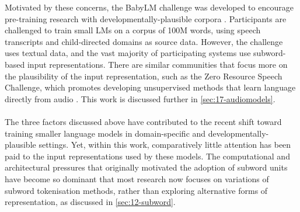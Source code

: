 
Motivated by these concerns, the BabyLM challenge was developed to encourage pre-training research with developmentally-plausible corpora \citep{warstadt2023findings, hu-etal-2024-findings}. Participants are challenged to train small LMs on a corpus of 100M words, using speech transcripts and child-directed domains as source data. However, the challenge uses textual data, and the vast majority of participating systems use subword-based input representations. There are similar communities that focus more on the plausibility of the input representation, such as the Zero Resource Speech Challenge, which promotes developing unsupervised methods that learn language directly from audio \citep{dunbar_self-supervised_2022}. This work is discussed further in \cref{sec:17-audiomodels}.

\paragraph{} The three factors discussed above have contributed to the recent shift toward training smaller language models in domain-specific and developmentally-plausible settings. Yet, within this work, comparatively little attention has been paid to the input representations used by these models. The computational and architectural pressures that originally motivated the adoption of subword units have become so dominant that most research now focuses on variations of subword tokenisation methods, rather than exploring alternative forms of representation, as discussed in \cref{sec:12-subword}.

